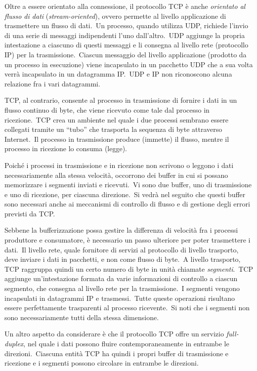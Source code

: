 Oltre a essere orientato alla connessione, il protocollo TCP è anche \emph{orientato al flusso di dati} (\emph{stream-oriented}), ovvero permette al livello applicazione di trasmettere un flusso di dati.\
Un processo, quando utilizza UDP, richiede l'invio di una serie di messaggi indipendenti l'uno dall'altro.\
UDP aggiunge la propria intestazione a ciascuno di questi messaggi e li consegna al livello rete (protocollo IP) per la trasmissione.\
Ciascun messaggio del livello applicazione (prodotto da un processo in esecuzione) viene incapsulato in un pacchetto UDP che a sua volta verrà incapsulato in un datagramma IP.\
UDP e IP non riconoscono alcuna relazione fra i vari datagrammi.

TCP, al contrario, consente al processo in trasmissione di fornire i dati in un flusso continuo di byte, che viene ricevuto come tale dal processo in ricezione.\
TCP crea un ambiente nel quale i due processi sembrano essere collegati tramite un ``tubo'' che trasporta la sequenza di byte attraverso Internet.\
Il processo in trasmissione produce (immette) il flusso, mentre il processo in ricezione lo consuma (legge).

Poiché i processi in trasmissione e in ricezione non scrivono o leggono i dati necessariamente alla stessa velocità, occorrono dei buffer in cui si possano memorizzare i segmenti inviati e ricevuti.\
Vi sono due buffer, uno di trasmissione e uno di ricezione, per ciascuna direzione.\
Si vedrà nel seguito che questi buffer sono necessari anche ai meccanismi di controllo di flusso e di gestione degli errori previsti da TCP.

Sebbene la bufferizzazione possa gestire la differenza di velocità fra i processi produttore e consumatore, è necessario un passo ulteriore per poter trasmettere i dati.\
Il livello rete, quale fornitore di servizi al protocollo di livello trasporto, deve inviare i dati in pacchetti, e non come flusso di byte.\
A livello trasporto, TCP raggruppa quindi un certo numero di byte in unità chiamate \emph{segmenti}.\
TCP aggiunge un'intestazione formata da varie informazioni di controllo a ciascun segmento, che consegna al livello rete per la trasmissione.\
I segmenti vengono incapsulati in datagrammi IP e trasmessi.\
Tutte queste operazioni risultano essere perfettamente trasparenti al processo ricevente.\
Si noti che i segmenti non sono necessariamente tutti della stessa dimensione.

Un altro aspetto da considerare è che il protocollo TCP offre un servizio \emph{full-duplex}, nel quale i dati possono fluire contemporaneamente in entrambe le direzioni.\
Ciascuna entità TCP ha quindi i propri  buffer di trasmissione e ricezione e i segmenti possono circolare in entrambe le direzioni.

